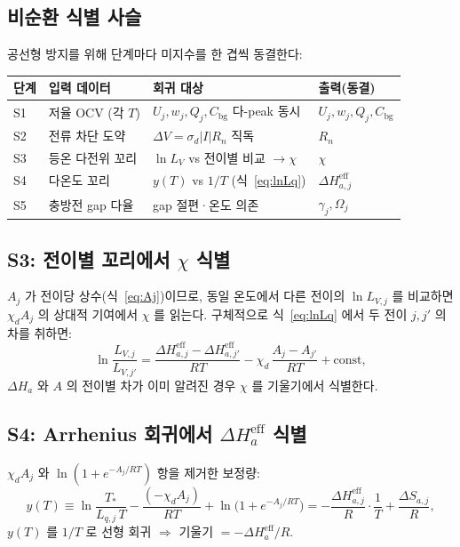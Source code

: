 \documentclass[11pt,a4paper]{article}
\newcommand{\eff}{\mathrm{eff}}
\newcommand{\bg}{\mathrm{bg}}
\begin{document}
\subsection{비순환 식별 사슬}

공선형 방지를 위해 단계마다 미지수를 한 겹씩 동결한다:

\begin{center}
\renewcommand{\arraystretch}{1.3}
\begin{tabular}{p{} p{} p{} p{}}
\toprule
단계 & 입력 데이터 & 회귀 대상 & 출력(동결)\\
\midrule
S1 & 저율 OCV (각 $T$) & $U_j, w_j, Q_j, C_\bg$ 다-peak 동시 & $U_j, w_j, Q_j, C_\bg$\\
S2 & 전류 차단 도약 & $\Delta V = \sigma_d|I|R_n$ 직독 & $R_n$\\
S3 & 등온 다전위 꼬리 & $\ln L_V$ vs 전이별 비교 $\to\chi$ & $\chi$\\
S4 & 다온도 꼬리 & $y(T)$ vs $1/T$ (식~\eqref{eq:lnLq}) & $\Delta H_{a,j}^\eff$\\
S5 & 충방전 gap 다율 & gap 절편·온도 의존 & $\gamma_j, \Omega_j$\\
\bottomrule
\end{tabular}
\end{center}

\subsection{S3: 전이별 꼬리에서 $\chi$ 식별}

$A_j$ 가 전이당 상수(식~\eqref{eq:Aj})이므로, 동일 온도에서 다른 전이의 $\ln L_{V,j}$
를 비교하면 $\chi_d A_j$ 의 상대적 기여에서 $\chi$ 를 읽는다. 구체적으로 식~\eqref{eq:lnLq}
에서 두 전이 $j, j'$ 의 차를 취하면:
\begin{equation}
\ln\frac{L_{V,j}}{L_{V,j'}} = \frac{\Delta H_{a,j}^\eff - \Delta H_{a,j'}^\eff}{RT}
  - \chi_d\,\frac{A_j - A_{j'}}{RT} + \text{const},
\label{eq:S3chi}
\end{equation}
$\Delta H_a$ 와 $A$ 의 전이별 차가 이미 알려진 경우 $\chi$ 를 기울기에서 식별한다.

\subsection{S4: Arrhenius 회귀에서 $\Delta H_a^\eff$ 식별}

$\chi_d A_j$ 와 $\ln(1+e^{-A_j/RT})$ 항을 제거한 보정량:
\begin{equation}
y(T) \equiv \ln\frac{T_*}{L_{q,j}\,T} - \frac{(-\chi_d A_j)}{RT} + \ln\!\bigl(1+e^{-A_j/RT}\bigr)
= -\frac{\Delta H_{a,j}^\eff}{R}\cdot\frac{1}{T} + \frac{\Delta S_{a,j}}{R},
\label{eq:arrhenius}
\end{equation}
$y(T)$ 를 $1/T$ 로 선형 회귀 $\Rightarrow$ 기울기 $= -\Delta H_a^\eff/R$.
\end{document}
